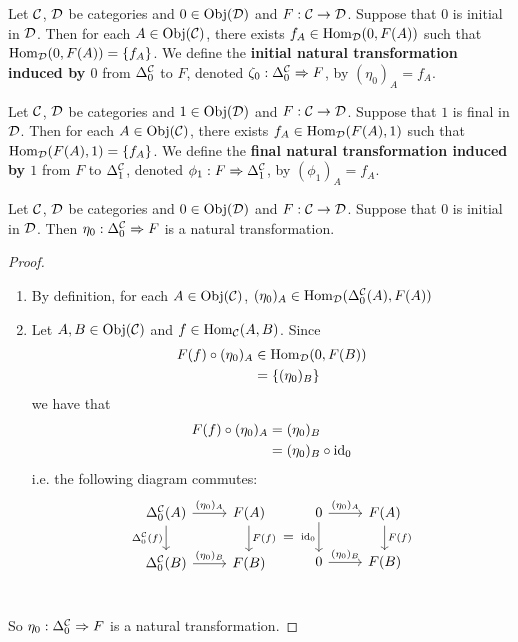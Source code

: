 \documentclass{book}
\begin{document}
	\begin{defn} 
		Let $\mathcal{C}$, $\mathcal{D}$ be categories and $0 \in \operatorname{Obj}(\mathcal{D})$ and $F: \mathcal{C} \rightarrow \mathcal{D}$. Suppose that $0$ is initial in $\mathcal{D}$. Then for each $A \in \operatorname{Obj}(\mathcal{C})$, there exists $f_A \in \operatorname{Hom}_{\mathcal{D}}(0, F(A))$ such that $\operatorname{Hom}_{\mathcal{D}}(0, F(A)) = \{f_A\}$. We define the \textbf{initial natural transformation induced by $0$} from $\Delta^{\mathcal{C}}_0$ to $F$, denoted $\zeta_{0}: \Delta^{\mathcal{C}}_0 \Rightarrow F$, by 
		$(\eta_0)_A = f_A$.
	\end{defn}

	\begin{defn} 
		Let $\mathcal{C}$, $\mathcal{D}$ be categories and $1 \in \operatorname{Obj}(\mathcal{D})$ and $F: \mathcal{C} \rightarrow \mathcal{D}$. Suppose that $1$ is final in $\mathcal{D}$. Then for each $A \in \operatorname{Obj}(\mathcal{C})$, there exists $f_A \in \operatorname{Hom}_{\mathcal{D}}(F(A), 1)$ such that $\operatorname{Hom}_{\mathcal{D}}(F(A), 1) = \{f_A\}$. We define the \textbf{final natural transformation induced by $1$} from $F$ to $\Delta^{\mathcal{C}}_1$, denoted $\phi_{1}: F \Rightarrow \Delta^{\mathcal{C}}_1$, by 
		$(\phi_{1})_A = f_A$.
	\end{defn}

	\begin{ex} 
		Let $\mathcal{C}$, $\mathcal{D}$ be categories and $0 \in \operatorname{Obj}(\mathcal{D})$ and $F: \mathcal{C} \rightarrow \mathcal{D}$. Suppose that $0$ is initial in $\mathcal{D}$. Then $\eta_0: \Delta^{\mathcal{C}}_0 \Rightarrow F$ is a natural transformation.
	\end{ex}

	\begin{proof} \
		\begin{enumerate}
			\item By definition, for each $A \in \operatorname{Obj}(\mathcal{C})$, $(\eta_0)_A \in \operatorname{Hom}_{\mathcal{D}}(\Delta^{\mathcal{C}}_0(A), F(A))$
			\item Let $A, B \in \operatorname{Obj}(\mathcal{C})$ and $f \in \operatorname{Hom}_{\mathcal{C}}(A, B)$. Since 
			\begin{align*}
				F(f) \circ (\eta_0)_A 
				& \in \operatorname{Hom}_{\mathcal{D}}(0, F(B)) \\
				& = \{(\eta_0)_B\}
			\end{align*}
			we have that 
			\begin{align*}
				F(f) \circ (\eta_0)_A 
				& = (\eta_0)_B \\
				& = (\eta_0)_B \circ \operatorname{id}_0 
			\end{align*}
			i.e. the following diagram commutes:
			\[ 
			\begin{tikzcd}[baseline= 7]
				\Del^{\MC}_0(A)  \arrow[r, "(\eta_0)_A"]  \arrow[d, "\Del^{\MC}_0(f)"']  & F(A)   \arrow[d, "F(f)"]\\
				\Del^{\MC}_0(B) \arrow[r, "(\eta_0)_B"] &  F(B) \\
			\end{tikzcd}
			=
			\begin{tikzcd}[baseline= 7]
				0  \arrow[r, "(\eta_0)_A"]  \arrow[d, "\id_0"']  & F(A)   \arrow[d, "F(f)"]\\
				0 \arrow[r, "(\eta_0)_B"] &  F(B) \\
			\end{tikzcd}
			\]
		\end{enumerate}
		So $\eta_0: \Delta^{\mathcal{C}}_0 \Rightarrow F$ is a natural transformation.
	\end{proof}
	
\end{document}
